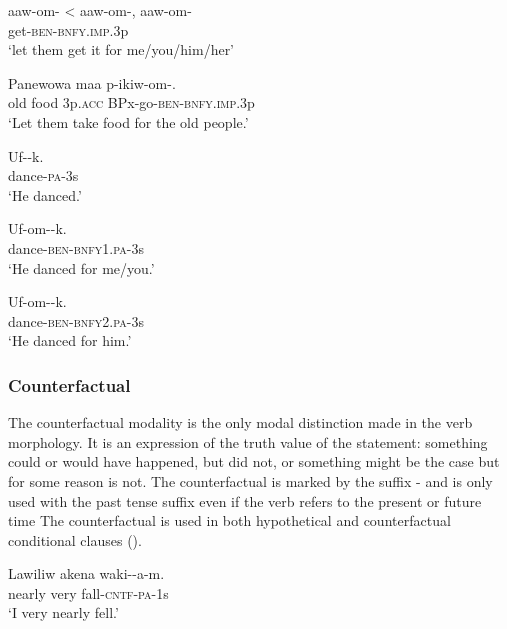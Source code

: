 \ea%
\label{ex:3:x1750}
\gll aaw-om- {{\textless} aaw-om-}, aaw-om- \\
get-\textsc{ben}-\textsc{bnfy}.\textsc{imp}.3p\\
\glt`let them get it for me/you/him/her'
\z

\ea%
\label{ex:3:x445}
\gll Panewowa maa  p-ikiw-om-. \\
old food 3p.\textsc{acc} BPx-go-\textsc{ben}-\textsc{bnfy}.\textsc{imp}.3p\\
\glt`Let them take food for the old people.'
\z

\ea%
\label{ex:3:x494}
\gll Uf--k. \\
dance-\textsc{pa}-3s\\
\glt`He danced.'
\z

\ea%
\label{ex:3:x495}
\gll Uf-om--k. \\
dance-\textsc{ben}-\textsc{bnfy}1.\textsc{pa}-3s\\
\glt`He danced for me/you.'
\z

\ea%
\label{ex:3:x496}
\gll Uf-om--k. \\
dance-\textsc{ben}-\textsc{bnfy}2.\textsc{pa}-3s\\
\glt`He danced for him.'
\z

\subsubsection{Counterfactual}\label{sec:3.8.3.2}
{}
The counterfactual modality is the only modal distinction made in the verb morphology. It is an expression of the truth value of the statement: something could or would have happened, but did not, or something might be the case but for some reason is not. The counterfactual is marked by the suffix \nobreakdash-  and is only used with the past tense suffix even if the verb refers to the present  or future  time The counterfactual is used in both hypothetical and counterfactual conditional clauses (). 

\ea%
\label{ex:3:x234}
\gll Lawiliw akena waki--a-m. \\
nearly very fall-\textsc{cntf}-\textsc{pa}-1s \\
\glt`I very nearly fell.' 
\z

